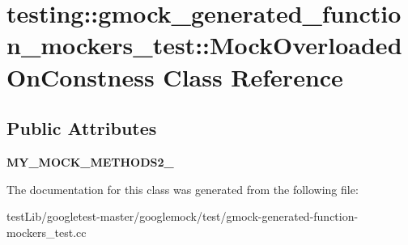 \hypertarget{classtesting_1_1gmock__generated__function__mockers__test_1_1MockOverloadedOnConstness}{}\section{testing\+:\+:gmock\+\_\+generated\+\_\+function\+\_\+mockers\+\_\+test\+:\+:Mock\+Overloaded\+On\+Constness Class Reference}
\label{classtesting_1_1gmock__generated__function__mockers__test_1_1MockOverloadedOnConstness}
\subsection*{Public Attributes}
\begin{DoxyCompactItemize}
\item 
\mbox{\label{classtesting_1_1gmock__generated__function__mockers__test_1_1MockOverloadedOnConstness_a3447041442c4ca64d597186e894b307d}} 
{\bfseries M\+Y\+\_\+\+M\+O\+C\+K\+\_\+\+M\+E\+T\+H\+O\+D\+S2\+\_\+}
\end{DoxyCompactItemize}


The documentation for this class was generated from the following file\+:\begin{DoxyCompactItemize}
\item 
test\+Lib/googletest-\/master/googlemock/test/gmock-\/generated-\/function-\/mockers\+\_\+test.\+cc\end{DoxyCompactItemize}
